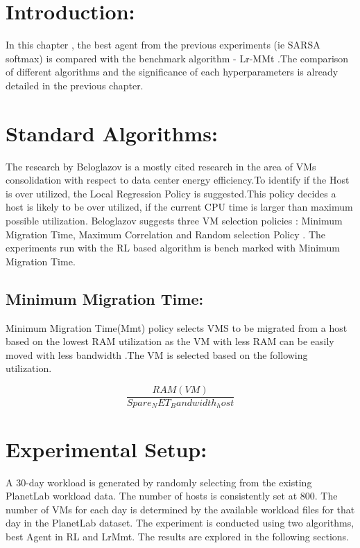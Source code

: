 \documentclass[a4paper,12pt]{Classes/RoboticsLaTeX}
\begin{document}
         \section{Introduction:}
         In this chapter , the best agent from the previous experiments (ie SARSA softmax)  is compared with the benchmark algorithm - Lr-MMt .The comparison of different algorithms and the significance of  each  hyperparameters is already detailed in the previous chapter.


        \section{Standard Algorithms:}
        The research by Beloglazov is a mostly cited research in the area of VMs consolidation with respect to data center energy efficiency.To identify if the Host is over utilized, the Local Regression Policy is suggested.This policy decides a host is likely to be over utilized, if the current CPU time is larger than maximum possible utilization.
        Beloglazov suggests three  VM selection policies : Minimum Migration Time, Maximum Correlation and Random selection Policy .\cite{calheiros2011cloudsim}
        The experiments run  with the RL based algorithm is bench marked with Minimum Migration Time.
    
        \subsection{Minimum Migration Time:}
        Minimum Migration Time(Mmt) policy selects VMS to be migrated from a host based on the lowest RAM utilization as the VM with less RAM can be easily moved with less bandwidth .The VM is selected based on the following utilization.

        \begin{equation}
        \frac{RAM(VM)}{Spare_NET_Bandwidth_host}
        \end{equation}

        \section{Experimental Setup:}
        A 30-day workload is generated by randomly selecting from the existing PlanetLab workload data. The number of hosts is consistently set at 800. The number of VMs for each day is determined by the available workload files for that day in the PlanetLab dataset.
        The experiment is conducted using two algorithms, best Agent in RL  and LrMmt. The results are explored in the following sections.
\end{document}
